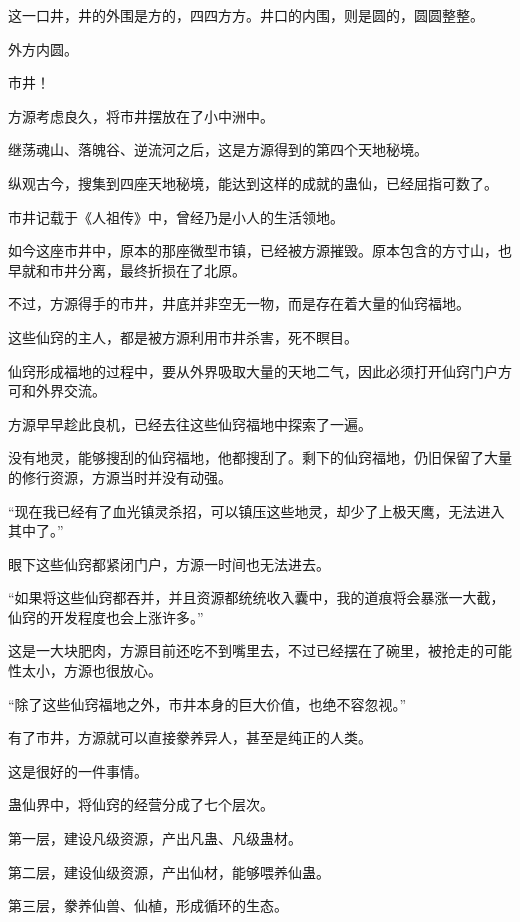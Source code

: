 
\begin{this_body}

这一口井，井的外围是方的，四四方方。井口的内围，则是圆的，圆圆整整。

外方内圆。

市井！

方源考虑良久，将市井摆放在了小中洲中。

继荡魂山、落魄谷、逆流河之后，这是方源得到的第四个天地秘境。

纵观古今，搜集到四座天地秘境，能达到这样的成就的蛊仙，已经屈指可数了。

市井记载于《人祖传》中，曾经乃是小人的生活领地。

如今这座市井中，原本的那座微型市镇，已经被方源摧毁。原本包含的方寸山，也早就和市井分离，最终折损在了北原。

不过，方源得手的市井，井底并非空无一物，而是存在着大量的仙窍福地。

这些仙窍的主人，都是被方源利用市井杀害，死不瞑目。

仙窍形成福地的过程中，要从外界吸取大量的天地二气，因此必须打开仙窍门户方可和外界交流。

方源早早趁此良机，已经去往这些仙窍福地中探索了一遍。

没有地灵，能够搜刮的仙窍福地，他都搜刮了。剩下的仙窍福地，仍旧保留了大量的修行资源，方源当时并没有动强。

“现在我已经有了血光镇灵杀招，可以镇压这些地灵，却少了上极天鹰，无法进入其中了。”

眼下这些仙窍都紧闭门户，方源一时间也无法进去。

“如果将这些仙窍都吞并，并且资源都统统收入囊中，我的道痕将会暴涨一大截，仙窍的开发程度也会上涨许多。”

这是一大块肥肉，方源目前还吃不到嘴里去，不过已经摆在了碗里，被抢走的可能性太小，方源也很放心。

“除了这些仙窍福地之外，市井本身的巨大价值，也绝不容忽视。”

有了市井，方源就可以直接豢养异人，甚至是纯正的人类。

这是很好的一件事情。

蛊仙界中，将仙窍的经营分成了七个层次。

第一层，建设凡级资源，产出凡蛊、凡级蛊材。

第二层，建设仙级资源，产出仙材，能够喂养仙蛊。

第三层，豢养仙兽、仙植，形成循环的生态。


\end{this_body}
